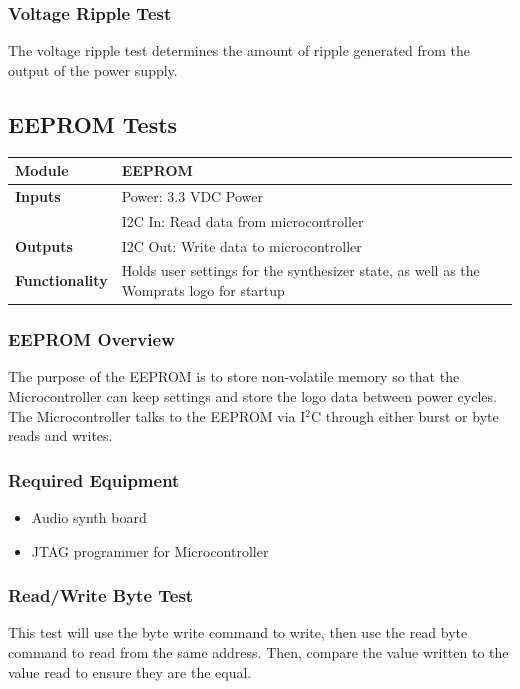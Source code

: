\documentclass{article}
\begin{document}
\subsubsection{Voltage Ripple Test}
The voltage ripple test determines the amount of ripple generated from the output of the power supply.  

\newpage
\subsection{EEPROM Tests}

\begin{tabular}{|p{1in}|p{5in}|}
\hline
\textbf{Module} & EEPROM \\
\hline
\textbf{Inputs}& Power: 3.3 VDC Power\\
	     & I2C In: Read data from microcontroller \\
\hline
\textbf{Outputs}& I2C Out: Write data to microcontroller \\ 
\hline
\textbf{Functionality}& Holds user settings for the synthesizer state, as well as the Womprats logo for startup\\
\hline
\end{tabular}
\subsubsection{EEPROM Overview}
The purpose of the EEPROM is to store non-volatile memory so that the Microcontroller can keep settings and store the logo data between power cycles. The Microcontroller talks to the EEPROM via I$^2$C through either burst or byte reads and writes.
\subsubsection{Required Equipment}
\begin{itemize}
\item Audio synth board
\item JTAG programmer for Microcontroller
\end{itemize}
\subsubsection{Read/Write Byte Test}
This test will use the byte write command to write, then use the read byte command to read from the same address. Then, compare the value written to the value read to ensure they are the equal.
\end{document}
